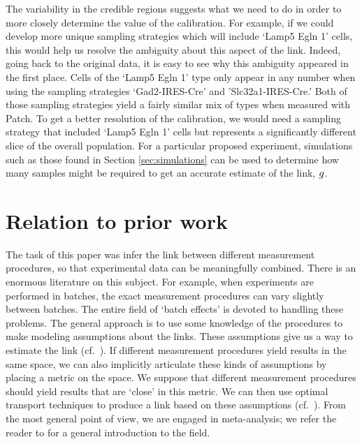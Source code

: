 The variability in the credible regions suggests what we need to do in order to more closely determine the value of the calibration.  For example, if we could develop more unique sampling strategies which will include `Lamp5 Egln 1' cells, this would help us resolve the ambiguity about this aspect of the link.  Indeed, going back to the original data, it is easy to see why this ambiguity appeared in the first place.  Cells of the `Lamp5 Egln 1' type only appear in any number when using the sampling strategies `Gad2-IRES-Cre' and 'Slc32a1-IRES-Cre.'  Both of those sampling strategies yield a fairly similar mix of types when measured with Patch.  To get a better resolution of the calibration, we would need a sampling strategy that included `Lamp5 Egln 1' cells but represents a significantly different slice of the overall population.  For a particular proposed experiment, simulations such as those found in Section \ref{sec:simulations} can be used to determine how many samples might be required to get an accurate estimate of the link, $g$.



\section{Relation to prior work}

The task of this paper was infer the link between different measurement procedures, so that experimental data can be meaningfully combined.  There is an enormous literature on this subject.  For example, when experiments are performed in batches, the exact measurement procedures can vary slightly between batches.  The entire field of `batch effects' is devoted to handling these problems.  The general approach is to use some knowledge of the procedures to make modeling assumptions about the links.  These assumptions give us a way to estimate the link (cf.\ \cite{johnson2007adjusting}).  If different measurement procedures yield results in the same space, we can also implicitly articulate these kinds of assumptions by placing a metric on the space.  We suppose that different measurement procedures should yield results that are `close' in this metric.  We can then use optimal transport techniques to produce a link based on these assumptions (cf.\ \cite{tabak2018explanation}).  From the most general point of view, we are engaged in meta-analysis; we refer the reader to \cite{borenstein2011introduction} for a general introduction to the field.  

